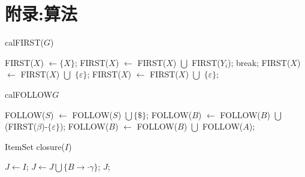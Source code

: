 \documentclass[11pt]{article}
\begin{document}
\section{附录:算法} \label{sec: algorithm}
\begin{algorithm}[h]
    \caption{calFIRST($G$)}
    \label{alg: first}
    \begin{algorithmic}[1]
    \REPEAT
    		\STATE FIRST($X$) $\leftarrow \{ X \}$;
				\STATE FIRST($X$) $ \leftarrow $ FIRST($X$) $\bigcup$ FIRST($Y_i$);
					\STATE break;
					\STATE FIRST($X$) $ \leftarrow $ FIRST($X$) $\bigcup$ $\{\varepsilon\}$;
				\ENDIF
			\ENDFOR
			\STATE FIRST($X$) $ \leftarrow $ FIRST($X$) $\bigcup$ $\{\varepsilon\}$;
		\ENDIF
    \end{algorithmic}
\end{algorithm}

\begin{algorithm}[h]
    \caption{calFOLLOW$G$}
    \label{alg: follow}
    \begin{algorithmic}[1]
    \REPEAT
	    \STATE FOLLOW($S$) $\leftarrow$ FOLLOW($S$) $\bigcup \{\$\}$;
    		\STATE FOLLOW($B$) $\leftarrow$ FOLLOW($B$) $\bigcup$ (FIRST($\beta$)-$\{\varepsilon\}$);
    			\STATE FOLLOW($B$) $\leftarrow$ FOLLOW($B$) $\bigcup$ FOLLOW($A$);
    		\ENDIF
    	\ENDIF
    \end{algorithmic}
\end{algorithm}
\begin{algorithm}[h]
    \caption{ItemSet closure($I$)}
    \label{alg: lr0closure}
    \begin{algorithmic}[1]
    	\STATE $J \leftarrow I$;
    	\REPEAT
    					\STATE $J \leftarrow J \bigcup \{ B \rightarrow \cdot \gamma \}$;
    				\ENDIF
    			\ENDFOR
    		\ENDFOR
    	\RETURN $J$;
    \end{algorithmic}
\end{algorithm}
\end{document}
